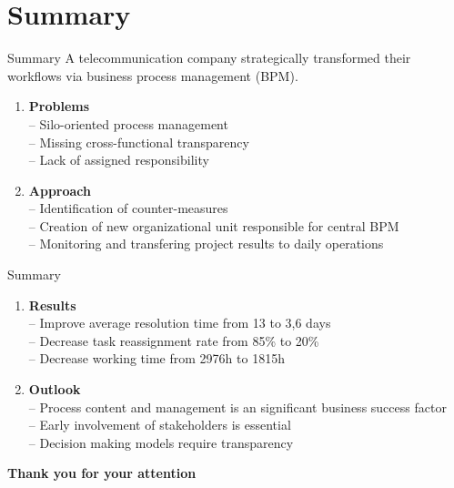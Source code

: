 \documentclass{beamer}
\begin{document}
\section{Summary}
\begin{frame}{Summary}
A telecommunication company strategically transformed their workflows via business process management (BPM).
    \begin{enumerate}[$\circ$]
        \item \textbf{Problems}\\-- Silo-oriented process management\\-- Missing cross-functional transparency\\-- Lack of assigned responsibility
        \item \textbf{Approach}\\-- Identification of counter-measures\\-- Creation of new organizational unit responsible for central BPM\\-- Monitoring and transfering project results to daily operations
    \end{enumerate}
\end{frame}

\begin{frame}{Summary}
    \begin{enumerate}[$\circ$]
        \item \textbf{Results}\\-- Improve average resolution time from 13 to 3,6 days\\-- Decrease task reassignment rate from 85\% to 20\%\\-- Decrease working time from 2976h to 1815h
        \item \textbf{Outlook}\\-- Process content and management is an significant business success factor\\-- Early involvement of stakeholders is essential\\-- Decision making models require transparency 
    \end{enumerate}
\end{frame}

\begin{frame}
    \centering \textbf{Thank you for your attention}
\end{frame}
\end{document}
